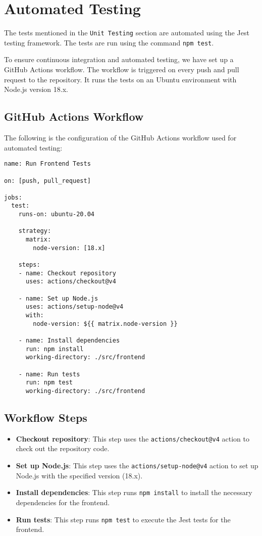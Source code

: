 \documentclass[12pt, titlepage]{article}
\begin{document}

\section{Automated Testing}
The tests mentioned in the \texttt{Unit Testing} section are automated using the Jest testing framework. The tests are run using the command \texttt{npm test}.

To ensure continuous integration and automated testing, we have set up a GitHub Actions workflow. The workflow is triggered on every push and pull request to the repository. It runs the tests on an Ubuntu environment with Node.js version 18.x.

\subsection{GitHub Actions Workflow}

The following is the configuration of the GitHub Actions workflow used for automated testing:

\begin{verbatim}
name: Run Frontend Tests

on: [push, pull_request]

jobs:
  test:
    runs-on: ubuntu-20.04

    strategy:
      matrix:
        node-version: [18.x]

    steps:
    - name: Checkout repository
      uses: actions/checkout@v4

    - name: Set up Node.js
      uses: actions/setup-node@v4
      with:
        node-version: ${{ matrix.node-version }}

    - name: Install dependencies
      run: npm install
      working-directory: ./src/frontend

    - name: Run tests
      run: npm test
      working-directory: ./src/frontend
\end{verbatim}

\subsection{Workflow Steps}

\begin{itemize}
    \item \textbf{Checkout repository}: This step uses the \texttt{actions/checkout@v4} action to check out the repository code.
    \item \textbf{Set up Node.js}: This step uses the \texttt{actions/setup-node@v4} action to set up Node.js with the specified version (18.x).
    \item \textbf{Install dependencies}: This step runs \texttt{npm install} to install the necessary dependencies for the frontend.
    \item \textbf{Run tests}: This step runs \texttt{npm test} to execute the Jest tests for the frontend.
\end{itemize}
\end{document}
